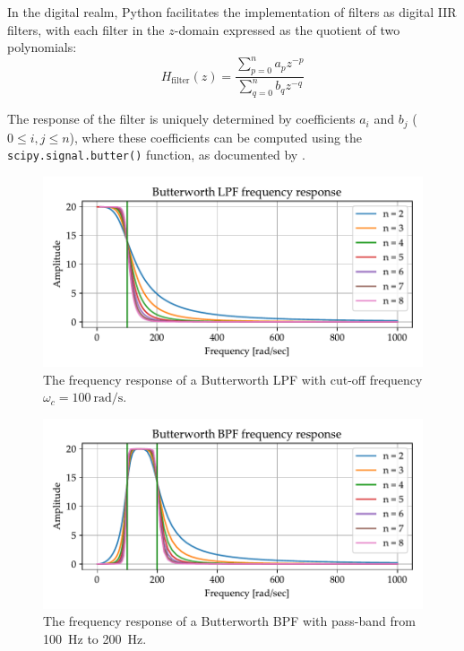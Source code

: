 \documentclass[../ECE459FinalProjectReport.tex]{subfiles}
\begin{document}
In the digital realm, Python facilitates the implementation of filters as digital IIR filters, with each filter in the $z$-domain expressed as the quotient of two polynomials:
\begin{equation}
H_{\text{filter}}(z) = \frac{\sum_{p=0}^{n}{a_pz^{-p}}}{\sum_{q=0}^{n}{b_qz^{-q}}}
\end{equation}

The response of the filter is uniquely determined by coefficients $a_i$ and $b_j$ ($0 \leq i, j \leq n$), where these coefficients can be computed using the \verb|scipy.signal.butter()| function, as documented by \cite{thescipycommunityScipySignalButter, thescipycommunityScipySignalFiltfilt, thescipycommunityScipySignalLfilter}.

\begin{figure}[htb]
    \centering
    \includegraphics[scale=.6]{plots/butterworth-lpf-nolog.pdf}
    \caption{The frequency response of a Butterworth LPF with cut-off frequency $\omega_c = \SI{100}{\radian\per\s}$.}
    \label{fig:butter-lpf}
\end{figure}
\begin{figure}[htb]
    \centering
    \includegraphics[scale=.6]{plots/butterworth-bpf-nolog.pdf}
    \caption{The frequency response of a Butterworth BPF with pass-band from \SI{100}{Hz} to \SI{200}{Hz}.}
    \label{fig:butter-bpf}
\end{figure}
\end{document}
